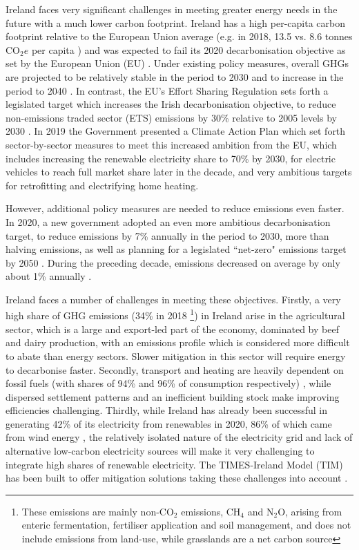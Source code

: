 \documentclass[gmd,manuscript]{copernicus}
\begin{document}
\introduction   %
Ireland faces very significant challenges in meeting greater energy needs in the future with a much lower carbon footprint. Ireland has a high per-capita carbon footprint relative to the European Union average (e.g. in 2018, 13.5 vs. 8.6 tonnes CO$_2e$ per capita \citep{EuropeanEnvironmentalAgency2022}) and was expected to fail its 2020 decarbonisation objective as set by the European Union (EU) \citep{DCCAE2019}. Under existing policy measures, overall GHGs are projected to be relatively stable in the period to 2030 and to increase in the period to 2040 \citep{EPA}. In contrast, the EU's Effort Sharing Regulation sets forth a legislated target which increases the Irish decarbonisation objective, to reduce non-emissions traded sector (ETS) emissions by 30\% relative to 2005 levels by 2030 \citep{CCAC2020}. In 2019 the Government presented a Climate Action Plan which set forth sector-by-sector measures to meet this increased ambition from the EU, which includes increasing the renewable electricity share to 70\% by 2030, for electric vehicles to reach full market share later in the decade, and very ambitious targets for retrofitting and electrifying home heating. 
 
However, additional policy measures are needed to reduce emissions even faster. In 2020, a new government adopted an even more ambitious decarbonisation target, to reduce emissions by 7\% annually in the period to 2030, more than halving emissions, as well as planning for a legislated ``net-zero" emissions target by 2050 \citep{DepartmentoftheTaoiseach2020}. During the preceding decade, emissions decreased on average by only about 1\% annually \citep{EuropeanEnvironmentalAgency2022}. 
 
Ireland faces a number of challenges in meeting these objectives. Firstly, a very high share of GHG emissions (34\% in 2018 \citep{EPA2019}\footnote{These emissions are mainly non-CO$_2$ emissions, CH$_4$ and N$_2$O, arising from enteric fermentation, fertiliser application and soil management, and does not include emissions from land-use, while grasslands are a net carbon source}) in Ireland arise in the agricultural sector, which is a large and export-led part of the economy, dominated by beef and dairy production, with an emissions profile which is considered more difficult to abate than energy sectors. Slower mitigation in this sector will require energy to decarbonise faster. Secondly, transport and heating are heavily dependent on fossil fuels (with shares of 94\% and 96\% of consumption respectively) \citep{SEAI2019}, while dispersed settlement patterns and an inefficient building stock make improving efficiencies challenging. Thirdly, while Ireland has already been successful in generating 42\% of its electricity from renewables in 2020, 86\% of which came from wind energy \citep{SEAI2021}, the relatively isolated nature of the electricity grid and lack of alternative low-carbon electricity sources will make it very challenging to integrate high shares of renewable electricity. The TIMES-Ireland Model (TIM) has been built to offer mitigation solutions taking these challenges into account \citep{Balyk2021}.
\end{document}
